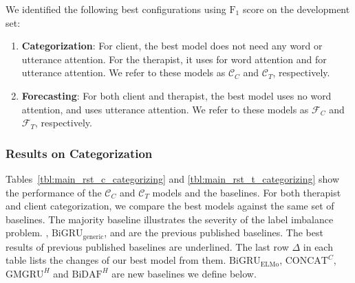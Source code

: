We identified the following best configurations using $\text{F}_{1}$
score on the development set:
\begin{enumerate}[nosep]
\item {\bf Categorization}: For client, the best model does not need any
  word or utterance attention. For the therapist, it uses \GMGRUH
  for word attention and \anchor for utterance attention. We refer
  to these models as $\mathcal{C}_C$ and $\mathcal{C}_T$, respectively.
\item {\bf Forecasting}: For both client and  therapist, the best
  model uses no word attention, and uses \self utterance
  attention. We refer to these models as $\mathcal{F}_C$ and
  $\mathcal{F}_T$, respectively.
\end{enumerate}

\subsubsection{Results on Categorization}
\label{sssec:snt:results-categorication}
Tables~\ref{tbl:main_rst_c_categorizing} and
\ref{tbl:main_rst_t_categorizing} show the performance of the
$\mathcal{C}_C$ and $\mathcal{C}_T$ models and the baselines.
%
For both therapist and client categorization, we compare the best
models against the same set of baselines. The majority baseline
illustrates the severity of the label imbalance
problem. \citet{xiao2016behavioral}, $\text{BiGRU}_{\text{generic}}$,
\citet{can2015dialog} and \citet{tanana2016comparison} are the
previous published baselines. The best results of previous published
baselines are underlined. The last row
$\Delta$ in each table lists the changes of our best model from
them. $\text{BiGRU}_{\text{ELMo}}$, $\text{CONCAT}^{C}$,
$\text{GMGRU}^{H}$ and $\text{BiDAF}^{H}$ are new baselines
we define below.

